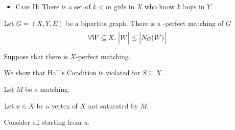 \begin{frame}{}
  \begin{itemize}
    \item \textsc{Case II:} There is a set of $k < m$ girls in $X$
      who know $k$ boys in $Y$.
  \end{itemize}
\end{frame}

\begin{frame}{}
  \begin{theorem}
    Let $G = (X, Y, E)$ be a bipartite graph.
    There is a -perfect matching of $G$ 
    \[
      \forall W \subseteq X.\; \Big\lvert W \Big\rvert \le \Big\lvert N_{G}(W) \Big\rvert
    \]
  \end{theorem}
\end{frame}

\begin{frame}{}
  \begin{definition}
      
  \end{definition}


  \pause
  \vspace{0.30cm}
  \begin{definition}
  \end{definition}
\end{frame}

\begin{frame}{}
  \begin{center}

    \pause
    \vspace{0.30cm}
    Suppose that there is  $X$-perfect matching.

    \pause
    \vspace{0.20cm}
    We show that Hall's Condition is violated for  $S \subseteq X$.

    \pause

    \pause
    Let $M$ be a  matching.

    \pause
    \vspace{0.20cm}
    Let $u \in X$ be a vertex of $X$ not saturated by $M$.

    \pause
    \vspace{0.20cm}
    Consider all  starting from $u$.
  \end{center}
\end{frame}

